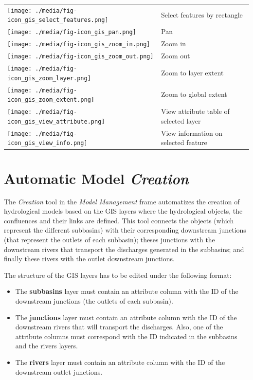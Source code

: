 \documentclass[
  letterpaper,
  DIV=11,
  numbers=noendperiod]{scrreprt}
\begin{document}
\begin{longtable}[]{@{}
  >{\raggedright\arraybackslash}p{}
  >{\raggedright\arraybackslash}p{}@{}}
\toprule()
\endhead
\texttt{[image: ./media/fig-icon\_gis\_select\_features.png]}
& Select features by rectangle \\
\texttt{[image: ./media/fig-icon\_gis\_pan.png]}
& Pan \\
\texttt{[image: ./media/fig-icon\_gis\_zoom\_in.png]}
& Zoom in \\
\texttt{[image: ./media/fig-icon\_gis\_zoom\_out.png]}
& Zoom out \\
\texttt{[image: ./media/fig-icon\_gis\_zoom\_layer.png]}
& Zoom to layer extent \\
\texttt{[image: ./media/fig-icon\_gis\_zoom\_extent.png]}
& Zoom to global extent \\
\texttt{[image: ./media/fig-icon\_gis\_view\_attribute.png]}
& View attribute table of selected layer \\
\texttt{[image: ./media/fig-icon\_gis\_view\_info.png]}
& View information on selected feature \\
\bottomrule()
\end{longtable}

\hypertarget{automatic-model-creation}{%
\chapter{\texorpdfstring{Automatic Model
\emph{Creation}}{Automatic Model Creation}}\label{automatic-model-creation}}

The \emph{Creation} tool in the \emph{Model Management} frame
automatizes the creation of hydrological models based on the GIS layers
where the hydrological objects, the confluences and their links are
defined. This tool connects the objects (which represent the different
subbasins) with their corresponding downstream junctions (that represent
the outlets of each subbasin); theses junctions with the downstream
rivers that transport the discharges generated in the subbasins; and
finally these rivers with the outlet downstream junctions.

The structure of the GIS layers has to be edited under the following
format:

\begin{itemize}
\item
  The \textbf{subbasins} layer must contain an attribute column with the
  ID of the downstream junctions (the outlets of each subbasin).
\item
  The \textbf{junctions} layer must contain an attribute column with the
  ID of the downstream rivers that will transport the discharges. Also,
  one of the attribute columns must correspond with the ID indicated in
  the subbasins and the rivers layers.
\item
  The \textbf{rivers} layer must contain an attribute column with the ID
  of the downstream outlet junctions.
\end{itemize}
\end{document}
